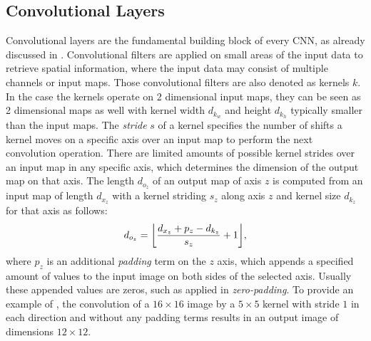 
\subsection{Convolutional Layers}\label{sec:nn_theory_cnn}
Convolutional layers are the fundamental building block of every CNN, as already discussed in .
Convolutional filters are applied on small areas of the input data to retrieve spatial information, where the input data may consist of multiple channels or input maps.
Those convolutional filters are also denoted as kernels $k$.
In the case the kernels operate on 2 dimensional input maps, they can be seen as 2 dimensional maps as well with kernel width $d_{k_w}$ and height $d_{k_h}$ typically smaller than the input maps.
The \emph{stride} $s$ of a kernel specifies the number of shifts a kernel moves on a specific axis over an input map to perform the next convolution operation.
There are limited amounts of possible kernel strides over an input map in any specific axis, which determines the dimension of the output map on that axis.
The length $d_{o_z}$ of an output map of axis $z$ is computed from an input map of length $d_{x_z}$ with a kernel striding $s_z$ along axis $z$ and kernel size $d_{k_z}$ for that axis as follows:
\begin{equation}\label{eq:nn_theory_cnn_dim}
  d_{o_z} = \floor*{\frac{d_{x_z} + p_z - d_{k_z}}{s_z} + 1},
\end{equation}
where $p_z$ is an additional \emph{padding} term on the $z$ axis, which appends a specified amount of values to the input image on both sides of the selected axis.
Usually these appended values are zeros, such as applied in \emph{zero-padding}.
To provide an example of , the convolution of a $16 \times 16$ image by a $5 \times 5$ kernel with stride $1$ in each direction and without any padding terms results in an output image of dimensions $12 \times 12$.

